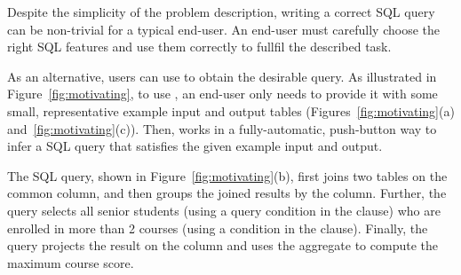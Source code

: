 Despite the simplicity of the problem description,
writing a correct SQL query  can be non-trivial for a typical
end-user. An end-user must carefully choose the
right SQL features and use them correctly
to fullfil the described task.

As an alternative, users can use \ourtool to obtain
the desirable query.
As illustrated in Figure~\ref{fig:motivating},
to use \ourtool, an end-user only needs to provide it with
some small, representative example input and output tables
(Figures~\ref{fig:motivating}(a) and~\ref{fig:motivating}(c)).
Then, \ourtool works in a fully-automatic, push-button
way to infer a SQL query that satisfies the given
example input and output.


The SQL query, shown in Figure~\ref{fig:motivating}(b),
first joins two tables on the common  column,
and then groups the joined results by the 
column. Further, the query selects all senior
students (using a query condition in the 
clause) who are enrolled in more than 2 courses
(using a condition in the  clause).
Finally, the query projects the result on the
 column and uses the  aggregate
to compute the maximum course score.







